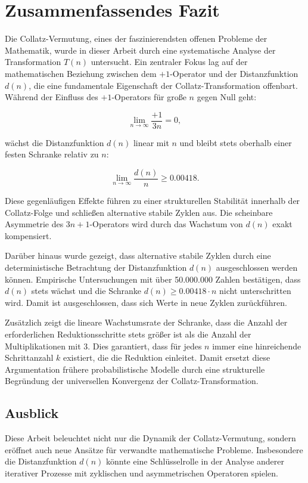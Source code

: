 \documentclass[a4paper,12pt]{article}
\begin{document}
\section{Zusammenfassendes Fazit}

Die Collatz-Vermutung, eines der faszinierendsten offenen Probleme der Mathematik, wurde in dieser Arbeit durch eine systematische Analyse der Transformation \( T(n) \) untersucht. Ein zentraler Fokus lag auf der mathematischen Beziehung zwischen dem \(+1\)-Operator und der Distanzfunktion \( d(n) \), die eine fundamentale Eigenschaft der Collatz-Transformation offenbart. Während der Einfluss des \(+1\)-Operators für große \( n \) gegen Null geht:

\[
\lim_{n \to \infty} \frac{+1}{3n} = 0,
\]

wächst die Distanzfunktion \( d(n) \) linear mit \( n \) und bleibt stets oberhalb einer festen Schranke relativ zu \( n \):

\[
\lim_{n \to \infty} \frac{d(n)}{n} \geq 0.00418.
\]

Diese gegenläufigen Effekte führen zu einer strukturellen Stabilität innerhalb der Collatz-Folge und schließen alternative stabile Zyklen aus. Die scheinbare Asymmetrie des \( 3n+1 \)-Operators wird durch das Wachstum von \( d(n) \) exakt kompensiert.

Darüber hinaus wurde gezeigt, dass alternative stabile Zyklen durch eine deterministische Betrachtung der Distanzfunktion \( d(n) \) ausgeschlossen werden können. Empirische Untersuchungen mit über 50.000.000 Zahlen bestätigen, dass \( d(n) \) stets wächst und die Schranke \( d(n) \geq 0.00418 \cdot n \) nicht unterschritten wird. Damit ist ausgeschlossen, dass sich Werte in neue Zyklen zurückführen.

Zusätzlich zeigt die lineare Wachstumsrate der Schranke, dass die Anzahl der erforderlichen Reduktionsschritte stets größer ist als die Anzahl der Multiplikationen mit 3. Dies garantiert, dass für jedes \( n \) immer eine hinreichende Schrittanzahl \( k \) existiert, die die Reduktion einleitet. Damit ersetzt diese Argumentation frühere probabilistische Modelle durch eine strukturelle Begründung der universellen Konvergenz der Collatz-Transformation.

\subsection{Ausblick}

Diese Arbeit beleuchtet nicht nur die Dynamik der Collatz-Vermutung, sondern eröffnet auch neue Ansätze für verwandte mathematische Probleme. Insbesondere die Distanzfunktion \( d(n) \) könnte eine Schlüsselrolle in der Analyse anderer iterativer Prozesse mit zyklischen und asymmetrischen Operatoren spielen.
\end{document}
